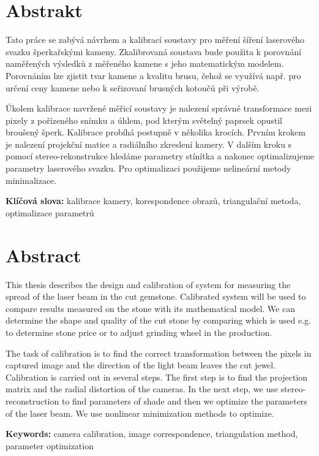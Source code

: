 \section*{Abstrakt}
Tato práce se zabývá návrhem a kalibrací soustavy pro měření šíření laserového svazku šperkařskými kameny. Zkalibrovaná soustava bude použita k porovnání naměřených výsledků z měřeného kamene s jeho matematickým modelem. Porovnáním lze zjistit tvar kamene a kvalitu brusu, čehož se využívá např. pro určení ceny kamene nebo k seřizovaní brusných kotoučů při výrobě.   

Úkolem kalibrace navržené měřicí soustavy je nalezení správné transformace mezi pixely z pořízeného snímku a úhlem, pod kterým světelný paprsek opustil broušený šperk. Kalibrace probíhá postupně v několika krocích. Prvním krokem je nalezení projekční matice a radiálního zkreslení kamery. V dalším kroku s pomocí stereo-rekonstrukce hledáme parametry stínítka a nakonec optimalizujeme parametry laserového svazku. Pro optimalizaci použijeme nelineární metody minimalizace. 

\textbf{Klíčová slova:} kalibrace kamery, korespondence obrazů, triangulační metoda, optimalizace parametrů 

\section*{Abstract}
	This thesis describes the design and calibration of system for measuring the spread of the laser beam in the cut gemstone. Calibrated system will be used to compare results measured on the stone with its mathematical model. We can determine the shape and quality of the cut stone by comparing which is used e.g. to determine stone price or to adjust grinding wheel in the production.

The task of calibration is to find the correct transformation between the pixels in captured image and the direction of the light beam leaves the cut jewel. Calibration is carried out in several steps. The first step is to find the projection matrix and the radial distortion of the cameras. In the next step, we use stereo-reconstruction to find parameters of shade and then we optimize the parameters of the laser beam. We use nonlinear minimization methods to optimize.

\textbf{Keywords:} camera calibration, image correspondence, triangulation method, parameter optimization
